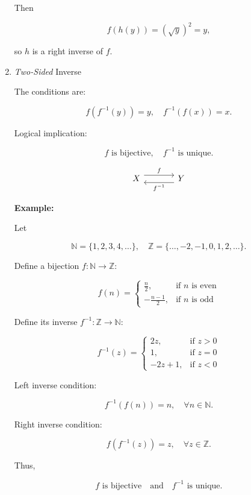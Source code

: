 \documentclass[12pt,a4paper,openany]{article}
\begin{document}
\begin{enumerate}
    Then

    \[
    f(h(y)) = (\sqrt{y})^2 = y,
    \]

    so $h$ is a right inverse of $f$.

\item \textit{Two-Sided} Inverse

    The conditions are:

    \[
    f(f^{-1}(y)) = y, \quad f^{-1}(f(x)) = x.
    \]

    Logical implication:

    \[
    f \text{ is bijective}, \quad f^{-1} \text{ is unique}.
    \]

    \[
    \begin{tikzcd}[row sep=large, column sep=large]
    X \arrow[r, shift left=1ex, "f"]
    & Y \arrow[l, shift left=1ex, "f^{-1}"]
    \end{tikzcd}
    \]

    \newpage
    \textbf{Example:}

    Let

    \[
    \mathbb{N} = \{1,2,3,4,\ldots\}, 
    \quad
    \mathbb{Z} = \{\ldots,-2,-1,0,1,2,\ldots\}.
    \]

    Define a bijection $f : \mathbb{N} \to \mathbb{Z}$:

    \[
    f(n) = 
    \begin{cases}
    \displaystyle\frac{n}{2}, & \text{if } n \text{ is even} \\[6pt]
    -\displaystyle\frac{n-1}{2}, & \text{if } n \text{ is odd}
    \end{cases}
    \]

    Define its inverse $f^{-1} : \mathbb{Z} \to \mathbb{N}$:

    \[
    f^{-1}(z) = 
    \begin{cases}
    2z, & \text{if } z > 0 \\[6pt]
    1, & \text{if } z = 0 \\[6pt]
    -2z + 1, & \text{if } z < 0
    \end{cases}
    \]

    Left inverse condition:

    \[
    f^{-1}(f(n)) = n, \quad \forall n \in \mathbb{N}.
    \]

    Right inverse condition:

    \[
    f(f^{-1}(z)) = z, \quad \forall z \in \mathbb{Z}.
    \]

    Thus,

    \[
    f \text{ is bijective} \quad \text{and} \quad f^{-1} \text{ is unique}.
    \]

\end{enumerate}
\end{document}
